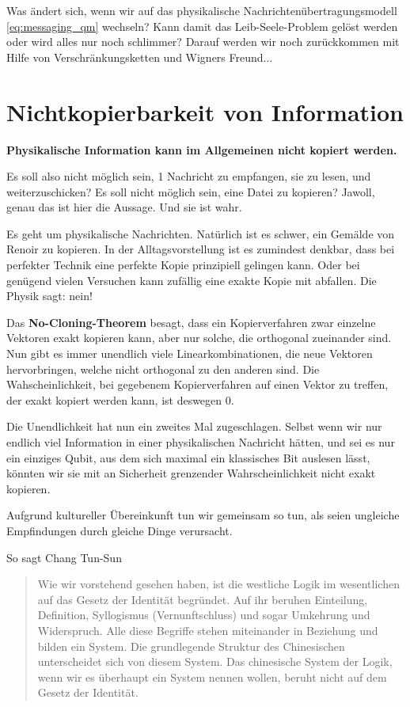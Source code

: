 \documentclass[12pt]{book}
\begin{document}
Was ändert sich, wenn wir auf das physikalische Nachrichtenübertragungsmodell \eqref{eq:messaging_qm} wechseln? Kann damit das Leib-Seele-Problem gelöst werden oder wird alles nur noch schlimmer? Darauf werden wir noch zurückkommen mit Hilfe von Verschränkungsketten und Wigners Freund...

\section{Nichtkopierbarkeit von Information}

\textbf{Physikalische Information kann im Allgemeinen nicht kopiert werden.}

Es soll also nicht möglich sein, 1 Nachricht zu empfangen, sie zu lesen, und weiterzuschicken? Es soll nicht möglich sein, eine Datei zu kopieren? Jawoll, genau das ist hier die Aussage. Und sie ist wahr. 

Es geht um physikalische Nachrichten. Natürlich ist es schwer, ein Gemälde von Renoir zu kopieren. In der Alltagsvorstellung ist es zumindest denkbar, dass bei perfekter Technik eine perfekte Kopie prinzipiell gelingen kann. Oder bei genügend vielen Versuchen kann zufällig eine exakte Kopie mit abfallen. Die Physik sagt: nein!

Das \textbf{No-Cloning-Theorem} besagt, dass ein Kopierverfahren zwar einzelne Vektoren exakt kopieren kann, aber nur solche, die orthogonal zueinander sind. Nun gibt es immer unendlich viele Linearkombinationen, die neue Vektoren hervorbringen, welche nicht orthogonal zu den anderen sind. Die Wahscheinlichkeit, bei gegebenem Kopierverfahren auf einen Vektor zu treffen, der exakt kopiert werden kann, ist deswegen 0.

Die Unendlichkeit hat nun ein zweites Mal zugeschlagen. Selbst wenn wir nur endlich viel Information in einer physikalischen Nachricht hätten, und sei es nur ein einziges Qubit, aus dem sich maximal ein klassisches Bit auslesen lässt, könnten wir sie mit an Sicherheit grenzender Wahrscheinlichkeit nicht exakt kopieren. 

Aufgrund kultureller Übereinkunft tun wir gemeinsam so tun, als seien ungleiche Empfindungen durch gleiche Dinge verursacht. 

So sagt Chang Tun-Sun

\begin{quote}\begin{tcolorbox}
Wie wir vorstehend gesehen haben, ist die westliche Logik im wesentlichen auf das Gesetz der Identität begründet. Auf ihr beruhen Einteilung, Definition, Syllogismus (Vernunftschluss) und sogar Umkehrung und Widerspruch. Alle diese Begriffe stehen miteinander in Beziehung und bilden ein System.
Die grundlegende Struktur des Chinesischen unterscheidet sich von diesem System. Das chinesische System der Logik, wenn wir es überhaupt ein System nennen wollen, beruht nicht auf dem Gesetz der Identität.
\end{tcolorbox}\end{quote}
\end{document}
